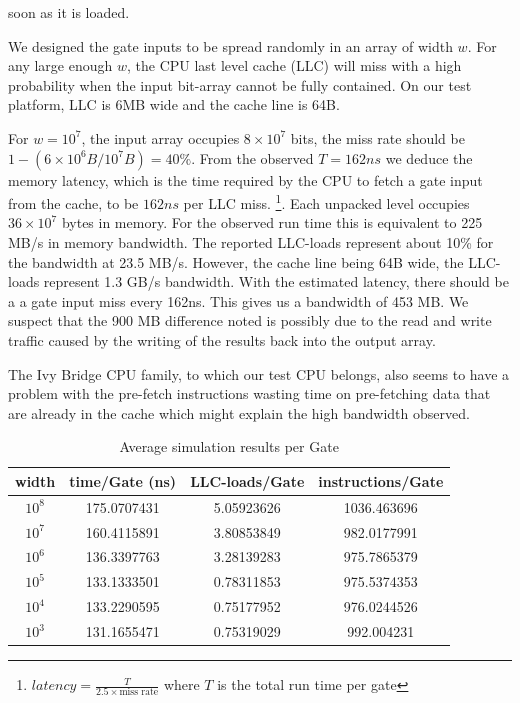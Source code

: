 soon as it is loaded.
\par
We designed the gate inputs to be spread randomly in an array of width $w$. For
any large enough $w$, the CPU last level cache (LLC) will miss with a high
probability when the input bit-array cannot be fully contained. On our test
platform, LLC is 6MB wide and the cache line is 64B\cite{agner}.
\par
For $w = 10^7$, the input array occupies $8 \times 10^7$ bits, the miss rate
should be $1 - (6\times10^6B/10^7B) = 40\%$. From the observed $T = 162ns$ we
deduce the memory latency, which is the time required by the CPU to fetch a gate
input from the cache, to be $162ns$ per LLC miss.
\footnote{ $latency = \frac{T}{2.5 \times \text{miss rate}}$ where $T$ is the total run time per gate}.
Each unpacked level occupies $ 36\times10^7$ bytes in memory. For the observed
run time this is equivalent to 225 MB/s in memory bandwidth. The reported LLC-loads
represent about 10\% for the bandwidth at 23.5 MB/s. However, the cache line
being 64B wide, the LLC-loads represent 1.3 GB/s bandwidth. With the estimated
latency, there should be a a gate input miss every 162ns. This gives us a bandwidth
of 453 MB. We suspect that the 900 MB difference noted is possibly due to the
read and write traffic caused by the writing of the results back into the output
array.
\par
The Ivy Bridge CPU family, to which our test CPU belongs, also seems to have a
problem with the pre-fetch instructions wasting time on pre-fetching data that
are already in the cache\cite{agner} which might explain the high bandwidth
observed.
\par
\begin{table}[]
\centering
\begin{tabular}{|c|c|c|c|}
\hline
width  & time/Gate (ns) & LLC-loads/Gate & instructions/Gate \\ \hline
$10^8$ & 175.0707431    & 5.05923626     & 1036.463696       \\ \hline
$10^7$ & 160.4115891    & 3.80853849     & 982.0177991       \\ \hline
$10^6$ & 136.3397763    & 3.28139283     & 975.7865379       \\ \hline
$10^5$ & 133.1333501    & 0.78311853     & 975.5374353       \\ \hline
$10^4$ & 133.2290595    & 0.75177952     & 976.0244526       \\ \hline
$10^3$ & 131.1655471    & 0.75319029     & 992.004231        \\ \hline
\end{tabular}
\caption{Average simulation results per Gate}
\label{tab:fig3}
\end{table}
